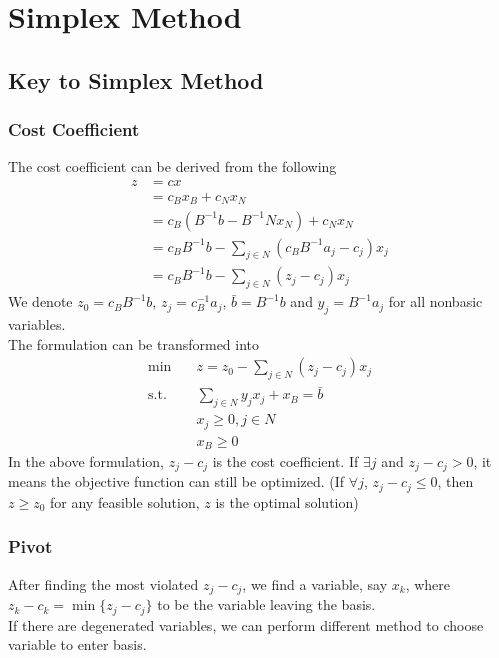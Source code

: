 		\section{Simplex Method}
			\subsection{Key to Simplex Method}
				\subsubsection{Cost Coefficient}
					The cost coefficient can be derived from the following
					\begin{align}
						z &= cx \\
						  &= c_Bx_B + c_Nx_N \\
						  &= c_B(B^{-1}b - B^{-1}Nx_N) + c_Nx_N\\
						  &= c_BB^{-1}b - \sum_{j\in N}(c_BB^{-1}a_j - c_j)x_j \\
						  &= c_BB^{-1}b - \sum_{j\in N}(z_j-c_j)x_j 
 					\end{align}
 					We denote $z_0 = c_BB^{-1}b$, $z_j = c_B^{-1}a_j$, $\bar{b} = B^{-1}b$ and $y_j = B^{-1}a_j$ for all nonbasic variables.\\
 					The formulation can be transformed into
 					\begin{align}
 						\min \quad & z = z_0 - \sum_{j\in N}(z_j - c_j)x_j\\
 						\text{s.t.} \quad & \sum_{j\in N}y_jx_j + x_B = \bar{b} \\
 										  & x_j \ge 0, j\in N \\
 										  & x_B \ge 0 
 					\end{align}
 					In the above formulation, $z_j - c_j$ is the cost coefficient. If $\exists j$ and $z_j - c_j > 0$, it means the objective function can still be optimized. (If $\forall j$, $z_j - c_j \le 0$, then $z \ge z_0$ for any feasible solution, $z$ is the optimal solution)

 				\subsubsection{Pivot}
 					After finding the most violated $z_j - c_j$, we find a variable, say $x_k$, where $z_k - c_k = \min \{z_j - c_j\}$ to be the variable leaving the basis. \\
 					If there are degenerated variables, we can perform different method to choose variable to enter basis.

